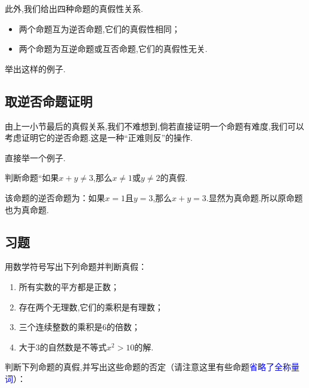 \documentclass[lang=cn,math=cm,chinesefont=nofont,11pt,scheme=chinese,twocol]{elegantbook}
\begin{document}
此外,我们给出四种命题的真假性关系.

\begin{itemize}
  \item 两个命题互为逆否命题,它们的真假性相同；
  \item 两个命题为互逆命题或互否命题,它们的真假性无关.
\end{itemize}

\begin{problem}
  举出这样的例子.
\end{problem}

\subsection{取逆否命题证明}

由上一小节最后的真假关系,我们不难想到,倘若直接证明一个命题有难度,我们可以考虑证明它的逆否命题.这是一种“正难则反”的操作.

直接举一个例子.

\begin{example}
  判断命题“如果$x+y\neq 3$,那么$x\neq 1$或$y\neq 2$的真假.
\end{example}

\begin{solution}
  该命题的逆否命题为：如果$x=1$且$y=3$,那么$x+y=3$.显然为真命题.所以原命题也为真命题.
\end{solution}

\subsection{习题}

\begin{exercise}
  用数学符号写出下列命题并判断真假：
\end{exercise}

\begin{enumerate}
  \item 所有实数的平方都是正数；
  \item 存在两个无理数,它们的乘积是有理数；
  \item 三个连续整数的乘积是6的倍数；
  \item 大于3的自然数是不等式$x^2>10$的解.
\end{enumerate}

\begin{exercise}
  判断下列命题的真假,并写出这些命题的否定（请注意这里有些命题\textcolor{blue}{省略了全称量词}）：
\end{exercise}
\end{document}
